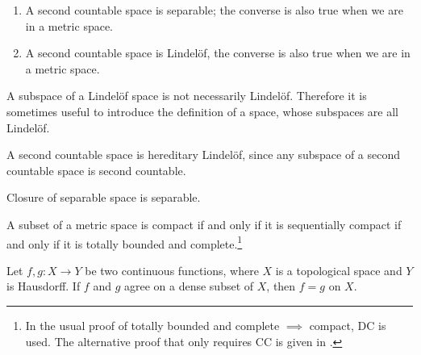 \begin{prop} \label{prop:2nd-count-separable-lindlof} \leavevmode
    \begin{enumerate}
        \item A second countable space is separable; the converse is also true when we are in a metric space.
        \item A second countable space is Lindelöf, the converse is also true when we are in a metric space.
    \end{enumerate}
\end{prop}

A subspace of a Lindelöf space is not necessarily Lindelöf. Therefore it is sometimes useful to introduce the definition of a  space, whose subspaces are all Lindelöf.

\begin{fact} \label{fact:Lind-property-2nd-count-space}
    A second countable space is hereditary Lindelöf, since any subspace of a second countable space is second countable.
\end{fact}

\begin{fact}
    Closure of separable space is separable.
\end{fact}


\begin{thm}\label{thm:char-thm-compact}
    A subset of a metric space is compact if and only if it is sequentially compact if and only if it is totally bounded and complete.\footnote{In the usual proof of totally bounded and complete $\implies$ compact, \textsf{DC} is used. The alternative proof that only requires \textsf{CC} is given in {\cite[Proposition~3.26]{Herrlich_2006}}.}
\end{thm}

\begin{prop} \label{prop:unique-dense-subset}
    Let $f,g\colon X \to Y$ be two continuous functions, where $X$ is a topological space and $Y$ is Hausdorff. If $f$ and $g$ agree on a dense subset of $X$, then $f = g$ on $X$.
\end{prop}


